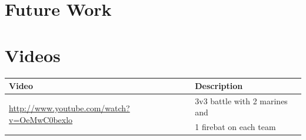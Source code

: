 \documentclass[a4paper]{article}
\begin{document}
\section{Future Work}
\label{sec:future}

\section{Videos}
\label{sec:videos}

\begin{center}
\begin{tabular}{|l|l|}
	\hline
	{\bf Video} & {\bf Description}\\ \hline
	\multirow{2}{*}{\url{http://www.youtube.com/watch?v=OeMwC0bexlo}} & 3v3 battle with 2 marines and \\
	& 1 firebat on each team \\ \hline
\end{tabular}
\end{center}
	
	


\end{document}
